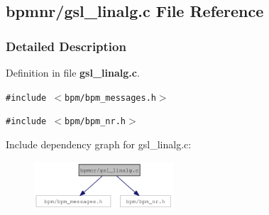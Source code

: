 \subsection{bpmnr/gsl\_\-linalg.c File Reference}
\label{gsl__linalg_8c}


\subsubsection{Detailed Description}


Definition in file {\bf gsl\_\-linalg.c}.

{\tt \#include $<$bpm/bpm\_\-messages.h$>$}\par
{\tt \#include $<$bpm/bpm\_\-nr.h$>$}\par


Include dependency graph for gsl\_\-linalg.c:\nopagebreak
\begin{figure}[H]
\begin{center}
\leavevmode
\includegraphics[width=147pt]{gsl__linalg_8c__incl}
\end{center}
\end{figure}

